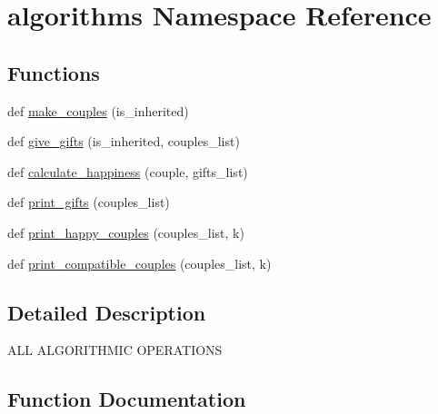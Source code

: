\hypertarget{namespacealgorithms}{}\section{algorithms Namespace Reference}
\label{namespacealgorithms}
\subsection*{Functions}
\begin{DoxyCompactItemize}
\item 
def \hyperlink{namespacealgorithms_acc69fe86364fcb612f8f0a55027f2919}{make\+\_\+couples} (is\+\_\+inherited)
\item 
def \hyperlink{namespacealgorithms_aff3ffb6acb1250c6b94a831f58cd06a2}{give\+\_\+gifts} (is\+\_\+inherited, couples\+\_\+list)
\item 
def \hyperlink{namespacealgorithms_ac187ca6a2afa224cc92cade5b75a60a3}{calculate\+\_\+happiness} (couple, gifts\+\_\+list)
\item 
def \hyperlink{namespacealgorithms_a85b9006d184fbb4a3bd59a7f6a9e92dc}{print\+\_\+gifts} (couples\+\_\+list)
\item 
def \hyperlink{namespacealgorithms_a83d77c8f62c04adba5f9ef3fa69a5b4d}{print\+\_\+happy\+\_\+couples} (couples\+\_\+list, k)
\item 
def \hyperlink{namespacealgorithms_a502a667b559f9342a2a9e8ebb2f487f5}{print\+\_\+compatible\+\_\+couples} (couples\+\_\+list, k)
\end{DoxyCompactItemize}


\subsection{Detailed Description}
\begin{DoxyVerb}ALL ALGORITHMIC OPERATIONS\end{DoxyVerb}
 

\subsection{Function Documentation}
